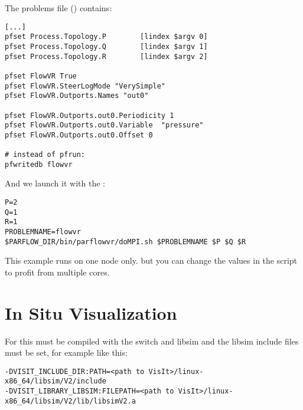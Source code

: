The problems  file () contains:
\begin{display}\begin{verbatim}
[...]
pfset Process.Topology.P        [lindex $argv 0]
pfset Process.Topology.Q        [lindex $argv 1]
pfset Process.Topology.R        [lindex $argv 2]

pfset FlowVR True
pfset FlowVR.SteerLogMode "VerySimple"
pfset FlowVR.Outports.Names "out0"

pfset FlowVR.Outports.out0.Periodicity 1
pfset FlowVR.Outports.out0.Variable  "pressure"
pfset FlowVR.Outports.out0.Offset 0

# instead of pfrun:
pfwritedb flowvr
\end{verbatim}\end{display}

And we launch it with the :
\begin{display}\begin{verbatim}
P=2
Q=1
R=1
PROBLEMNAME=flowvr
$PARFLOW_DIR/bin/parflowvr/doMPI.sh $PROBLEMNAME $P $Q $R
\end{verbatim}\end{display}

This example runs on one node only. but you can change the  values in the 
script to profit from multiple cores.

\section{In Situ Visualization}
For this \parflow{} must be compiled with the 
switch and libsim and the libsim include files must be set, for example like this:
\begin{display}\begin{verbatim}
-DVISIT_INCLUDE_DIR:PATH=<path to VisIt>/linux-x86_64/libsim/V2/include
-DVISIT_LIBRARY_LIBSIM:FILEPATH=<path to VisIt>/linux-x86_64/libsim/V2/lib/libsimV2.a
\end{verbatim}\end{display}


